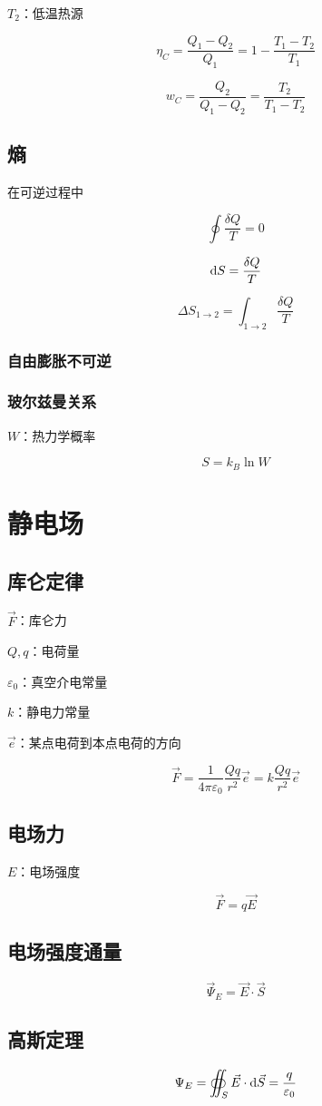\documentclass{article}
\begin{document}
$T_2$：低温热源

\[\eta_C=\frac{Q_1-Q_2}{Q_1}=1-\frac{T_1-T_2}{T_1}\]

\[w_C=\frac{Q_2}{Q_1-Q_2}=\frac{T_2}{T_1-T_2}\]

\subsection{熵}

在可逆过程中

\[\oint\frac{\delta Q}T=0\]

\[\mathrm d S=\frac{\delta Q}T\]

\[\Delta S_{1\to2}=\int_{1\to2}\frac{\delta Q}T\]

\subsubsection{自由膨胀不可逆}

\subsubsection{玻尔兹曼关系}

$W$：热力学概率

\[S=k_B\ln W\]

\section{静电场}

\subsection{库仑定律}

$\vec F$：库仑力

$Q,q$：电荷量

$\varepsilon_0$：真空介电常量

$k$：静电力常量

$\vec e$：某点电荷到本点电荷的方向

\[\vec F=\frac1{4\pi\varepsilon_0}\frac{Qq}{r^2}\vec e=k\frac{Qq}{r^2}\vec e\]

\subsection{电场力}

$E$：电场强度

\[\vec F=q\vec E\]

\subsection{电场强度通量}

\[\vec\Psi_E=\vec E\cdot\vec S\]

\subsection{高斯定理}

\[\Psi_E=\oiint_S\vec E\cdot\mathrm d\vec S=\frac q{\varepsilon_0}\]
\end{document}
